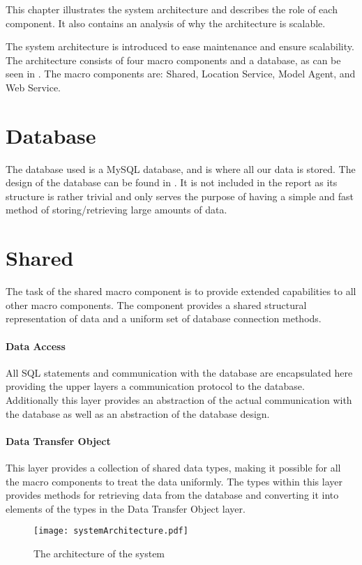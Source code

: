 This chapter illustrates the system architecture and describes the role of each component.
It also contains an analysis of why the architecture is scalable.

The system architecture is introduced to ease maintenance and ensure scalability.
The architecture consists of four macro components and a database, as can be seen in . The macro components are: Shared, Location Service, Model Agent, and Web Service.

\section{Database} The database used is a MySQL database, and is where all our data is stored.
The design of the database can be found in .
It is not included in the report as its structure is rather trivial and only serves the purpose of having a simple and fast method of storing/retrieving large amounts of data.

\section{Shared}
The task of the shared macro component is to provide extended capabilities to all other macro components.
The component provides a shared structural representation of data and a uniform set of database connection methods.

\paragraph{Data Access} All SQL statements and communication with the database are encapsulated here providing the upper layers a communication protocol to the database.
Additionally this layer provides an abstraction of the actual communication with the database as well as an abstraction of the database design.

\paragraph{Data Transfer Object} This layer provides a collection of shared data types, making it possible for all the macro components to treat the data uniformly.
The types within this layer provides methods for retrieving data from the database and converting it into elements of the types in the Data Transfer Object layer.

\begin{figure}[H]
\texttt{[image: systemArchitecture.pdf]}
\caption{The architecture of the system}
\label{fig:architecture}
\end{figure}

